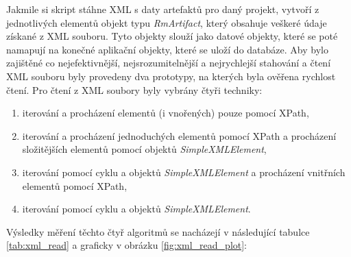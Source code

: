 \documentclass[czech,master]{diploma}
\begin{document}
Jakmile si skript stáhne XML s daty artefaktů pro daný projekt, vytvoří z jednotlivých elementů objekt typu \textit{RmArtifact}, který obsahuje veškeré údaje získané z XML souboru. Tyto objekty slouží jako datové objekty, které se poté namapují na konečné aplikační objekty, které se uloží do databáze. Aby bylo zajištěné co nejefektivnější, nejsrozumitelnější a nejrychlejší stahování a čtení XML souboru byly provedeny dva prototypy, na kterých byla ověřena rychlost čtení. Pro čtení z XML soubory byly vybrány čtyři techniky:

\begin{enumerate}
\item iterování a procházení elementů (i vnořených) pouze pomocí XPath,
\item iterování a procházení jednoduchých elementů pomocí XPath a procházení složitějších elementů pomocí objektů \textit{SimpleXMLElement},
\item iterování pomocí cyklu a objektů \textit{SimpleXMLElement} a procházení vnitřních elementů pomocí XPath,
\item iterování pomocí cyklu a objektů \textit{SimpleXMLElement}.
\end{enumerate}

Výsledky měření těchto čtyř algoritmů se nacházejí v následující tabulce \ref{tab:xml_read} a graficky v obrázku \ref{fig:xml_read_plot}:
\end{document}
